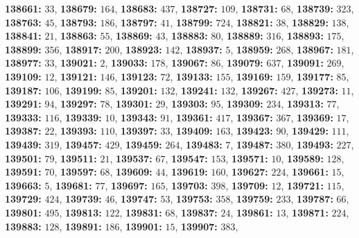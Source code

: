 \textsf{\bfseries 138661:} $33$, \textsf{\bfseries 138679:} $164$, \textsf{\bfseries 138683:} $437$, \textsf{\bfseries 138727:} $109$, \textsf{\bfseries 138731:} $68$, \textsf{\bfseries 138739:} $323$, \textsf{\bfseries 138763:} $45$, \textsf{\bfseries 138793:} $186$, \textsf{\bfseries 138797:} $41$, \textsf{\bfseries 138799:} $724$, \textsf{\bfseries 138821:} $38$, \textsf{\bfseries 138829:} $138$, \textsf{\bfseries 138841:} $21$, \textsf{\bfseries 138863:} $55$, \textsf{\bfseries 138869:} $43$, \textsf{\bfseries 138883:} $80$, \textsf{\bfseries 138889:} $316$, \textsf{\bfseries 138893:} $175$, \textsf{\bfseries 138899:} $356$, \textsf{\bfseries 138917:} $200$, \textsf{\bfseries 138923:} $142$, \textsf{\bfseries 138937:} $5$, \textsf{\bfseries 138959:} $268$, \textsf{\bfseries 138967:} $181$, \textsf{\bfseries 138977:} $33$, \textsf{\bfseries 139021:} $2$, \textsf{\bfseries 139033:} $178$, \textsf{\bfseries 139067:} $86$, \textsf{\bfseries 139079:} $637$, \textsf{\bfseries 139091:} $269$, \textsf{\bfseries 139109:} $12$, \textsf{\bfseries 139121:} $146$, \textsf{\bfseries 139123:} $72$, \textsf{\bfseries 139133:} $155$, \textsf{\bfseries 139169:} $159$, \textsf{\bfseries 139177:} $85$, \textsf{\bfseries 139187:} $106$, \textsf{\bfseries 139199:} $85$, \textsf{\bfseries 139201:} $132$, \textsf{\bfseries 139241:} $132$, \textsf{\bfseries 139267:} $427$, \textsf{\bfseries 139273:} $11$, \textsf{\bfseries 139291:} $94$, \textsf{\bfseries 139297:} $78$, \textsf{\bfseries 139301:} $29$, \textsf{\bfseries 139303:} $95$, \textsf{\bfseries 139309:} $234$, \textsf{\bfseries 139313:} $77$, \textsf{\bfseries 139333:} $116$, \textsf{\bfseries 139339:} $10$, \textsf{\bfseries 139343:} $91$, \textsf{\bfseries 139361:} $417$, \textsf{\bfseries 139367:} $367$, \textsf{\bfseries 139369:} $17$, \textsf{\bfseries 139387:} $22$, \textsf{\bfseries 139393:} $110$, \textsf{\bfseries 139397:} $33$, \textsf{\bfseries 139409:} $163$, \textsf{\bfseries 139423:} $90$, \textsf{\bfseries 139429:} $111$, \textsf{\bfseries 139439:} $319$, \textsf{\bfseries 139457:} $429$, \textsf{\bfseries 139459:} $264$, \textsf{\bfseries 139483:} $7$, \textsf{\bfseries 139487:} $380$, \textsf{\bfseries 139493:} $227$, \textsf{\bfseries 139501:} $79$, \textsf{\bfseries 139511:} $21$, \textsf{\bfseries 139537:} $67$, \textsf{\bfseries 139547:} $153$, \textsf{\bfseries 139571:} $10$, \textsf{\bfseries 139589:} $128$, \textsf{\bfseries 139591:} $70$, \textsf{\bfseries 139597:} $68$, \textsf{\bfseries 139609:} $44$, \textsf{\bfseries 139619:} $160$, \textsf{\bfseries 139627:} $224$, \textsf{\bfseries 139661:} $15$, \textsf{\bfseries 139663:} $5$, \textsf{\bfseries 139681:} $77$, \textsf{\bfseries 139697:} $165$, \textsf{\bfseries 139703:} $398$, \textsf{\bfseries 139709:} $12$, \textsf{\bfseries 139721:} $115$, \textsf{\bfseries 139729:} $424$, \textsf{\bfseries 139739:} $46$, \textsf{\bfseries 139747:} $53$, \textsf{\bfseries 139753:} $358$, \textsf{\bfseries 139759:} $233$, \textsf{\bfseries 139787:} $66$, \textsf{\bfseries 139801:} $495$, \textsf{\bfseries 139813:} $122$, \textsf{\bfseries 139831:} $68$, \textsf{\bfseries 139837:} $24$, \textsf{\bfseries 139861:} $13$, \textsf{\bfseries 139871:} $224$, \textsf{\bfseries 139883:} $128$, \textsf{\bfseries 139891:} $186$, \textsf{\bfseries 139901:} $15$, \textsf{\bfseries 139907:} $383$, 
